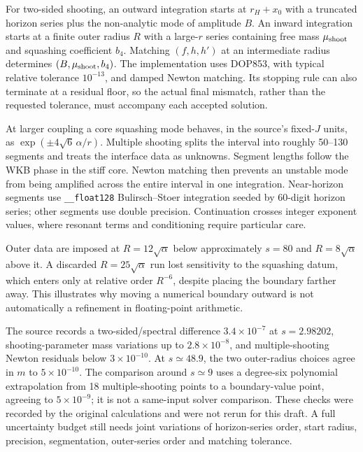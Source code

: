 \documentclass[11pt,a4paper]{article}
\begin{document}
For two-sided shooting, an outward integration starts at $r_H+x_0$ with a truncated horizon series plus the non-analytic mode of amplitude $B$. An inward integration starts at a finite outer radius $R$ with a large-$r$ series containing free mass $\mu_{\rm shoot}$ and squashing coefficient $b_4$. Matching $(f,h,h')$ at an intermediate radius determines $(B,\mu_{\rm shoot},b_4)$. The implementation uses DOP853, with typical relative tolerance $10^{-13}$, and damped Newton matching. Its stopping rule can also terminate at a residual floor, so the actual final mismatch, rather than the requested tolerance, must accompany each accepted solution.

At larger coupling a core squashing mode behaves, in the source's fixed-$J$ units, as $\exp(\pm4\sqrt6\,\alpha/r)$. Multiple shooting splits the interval into roughly 50--130 segments and treats the interface data as unknowns. Segment lengths follow the WKB phase in the stiff core. Newton matching then prevents an unstable mode from being amplified across the entire interval in one integration. Near-horizon segments use \texttt{\_\_float128} Bulirsch--Stoer integration seeded by 60-digit horizon series; other segments use double precision. Continuation crosses integer exponent values, where resonant terms and conditioning require particular care.

Outer data are imposed at $R=12\sqrt\alpha$ below approximately $s=80$ and $R=8\sqrt\alpha$ above it. A discarded $R=25\sqrt\alpha$ run lost sensitivity to the squashing datum, which enters only at relative order $R^{-6}$, despite placing the boundary farther away. This illustrates why moving a numerical boundary outward is not automatically a refinement in floating-point arithmetic.

The source records a two-sided/spectral difference $3.4\times10^{-7}$ at $s=2.98202$, shooting-parameter mass variations up to $2.8\times10^{-8}$, and multiple-shooting Newton residuals below $3\times10^{-10}$. At $s\simeq48.9$, the two outer-radius choices agree in $m$ to $5\times10^{-10}$. The comparison around $s\simeq9$ uses a degree-six polynomial extrapolation from 18 multiple-shooting points to a boundary-value point, agreeing to $5\times10^{-9}$; it is not a same-input solver comparison. These checks were recorded by the original calculations and were not rerun for this draft. A full uncertainty budget still needs joint variations of horizon-series order, start radius, precision, segmentation, outer-series order and matching tolerance.
\end{document}
